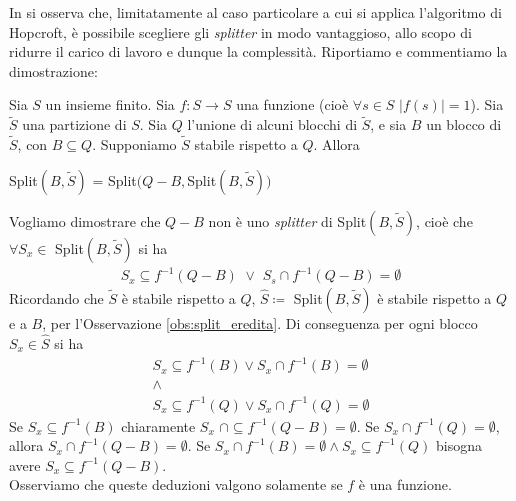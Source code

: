 In \cite{paigetarjan} si osserva che, limitatamente al caso particolare a cui si applica l'algoritmo di Hopcroft, è possibile scegliere gli \emph{splitter} in modo vantaggioso, allo scopo di ridurre il carico di lavoro e dunque la complessità. Riportiamo e commentiamo la dimostrazione:
\begin{observation}
    Sia $S$ un insieme finito. Sia $f : S \to S$ una funzione (cioè $\forall s \in S\,\, |f({s})| = 1$). Sia $\widetilde{S}$ una partizione di $S$. Sia $Q$ l'unione di alcuni blocchi di $\widetilde{S}$, e sia $B$ un blocco di $\widetilde{S}$, con $B \subseteq Q$. Supponiamo $\widetilde{S}$ stabile rispetto a $Q$. Allora
    \begin{center}
        Split$(B,\widetilde{S})$ = Split$(Q - B, $Split$(B,\widetilde{S}))$
    \end{center}
\end{observation}
\begin{proof2}
    Vogliamo dimostrare che $Q - B$ non è uno \emph{splitter} di Split$(B,\widetilde{S})$, cioè che $\forall S_x \in $ Split$(B,\widetilde{S})$ si ha
    \begin{gather*}
        S_x \subseteq f^{-1}(Q - B) \,\,\lor\,\, S_s \cap f^{-1}(Q-B) = \emptyset
    \end{gather*}
    Ricordando che $\widetilde{S}$ è stabile rispetto a $Q$, $\widehat{S} \coloneqq$ Split$(B,\widetilde{S})$ è stabile rispetto a $Q$ e a $B$, per l'Osservazione \ref*{obs:split_eredita}. Di conseguenza per ogni blocco $S_x \in \widehat{S}$ si ha
    \begin{gather*}
        S_x \subseteq f^{-1}(B) \lor S_x \cap f^{-1}(B) = \emptyset\\
        \land\\
        S_x \subseteq f^{-1}(Q) \lor S_x \cap f^{-1}(Q) = \emptyset
    \end{gather*}
    Se $S_x \subseteq f^{-1}(B)$ chiaramente $S_x \,\,\cap \subseteq f^{-1}(Q-B) = \emptyset$. Se $S_x \cap f^{-1}(Q) = \emptyset$, allora $S_x \cap f^{-1}(Q-B) = \emptyset$. Se $S_x \cap f^{-1}(B) = \emptyset \land S_x \subseteq f^{-1}(Q)$ bisogna avere $S_x \subseteq f^{-1}(Q-B)$.\\
    Osserviamo che queste deduzioni valgono solamente se $f$ è una funzione.
\end{proof2}

